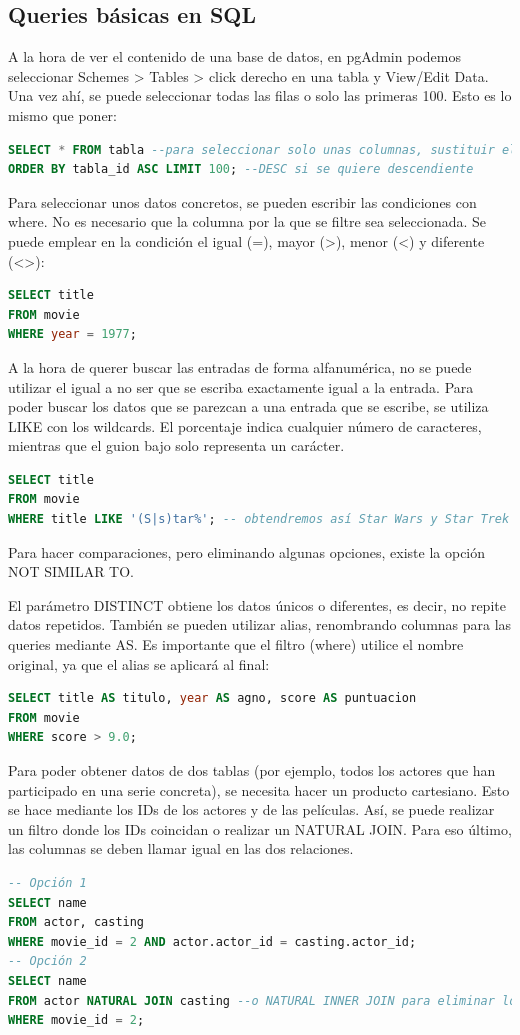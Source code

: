 \subsection{Queries básicas en SQL}
A la hora de ver el contenido de una base de datos, en pgAdmin podemos seleccionar Schemes > Tables > click derecho en una tabla y View/Edit Data. Una vez ahí, se puede seleccionar todas las filas o solo las primeras 100. Esto es lo mismo que poner:
\begin{lstlisting}[language=SQL]
SELECT * FROM tabla --para seleccionar solo unas columnas, sustituir el asterisco por el nombre de las columnas
ORDER BY tabla_id ASC LIMIT 100; --DESC si se quiere descendiente
\end{lstlisting}
Para seleccionar unos datos concretos, se pueden escribir las condiciones con where. No es necesario que la columna por la que se filtre sea seleccionada. Se puede emplear en la condición el igual (=), mayor (>), menor (<) y diferente (<>):
\begin{lstlisting}[language=SQL]
SELECT title 
FROM movie 
WHERE year = 1977;
\end{lstlisting}
A la hora de querer buscar las entradas de forma alfanumérica, no se puede utilizar el igual a no ser que se escriba exactamente igual a la entrada. Para poder buscar los datos que se parezcan a una entrada que se escribe, se utiliza LIKE con los wildcards. El porcentaje indica cualquier número de caracteres, mientras que el guion bajo solo representa un carácter.
\begin{lstlisting}[language=SQL]
SELECT title 
FROM movie 
WHERE title LIKE '(S|s)tar%'; -- obtendremos así Star Wars y Star Trek junto con películas que empiecen por star (en minúscula).
\end{lstlisting}
Para hacer comparaciones, pero eliminando algunas opciones, existe la opción NOT SIMILAR TO. 

El parámetro DISTINCT obtiene los datos únicos o diferentes, es decir, no repite datos repetidos. También se pueden utilizar alias, renombrando columnas para las queries mediante AS. Es importante que el filtro (where) utilice el nombre original, ya que el alias se aplicará al final: 
\begin{lstlisting}[language=SQL]
SELECT title AS titulo, year AS agno, score AS puntuacion
FROM movie
WHERE score > 9.0;
\end{lstlisting}

Para poder obtener datos de dos tablas (por ejemplo, todos los actores que han participado en una serie concreta), se necesita hacer un producto cartesiano. Esto se hace mediante los IDs de los actores y de las películas. Así, se puede realizar un filtro donde los IDs coincidan o realizar un NATURAL JOIN. Para eso último, las columnas se deben llamar igual en las dos relaciones.
\begin{lstlisting}[language=SQL]
-- Opción 1
SELECT name
FROM actor, casting
WHERE movie_id = 2 AND actor.actor_id = casting.actor_id;
-- Opción 2
SELECT name
FROM actor NATURAL JOIN casting --o NATURAL INNER JOIN para eliminar los datos nulos
WHERE movie_id = 2;
\end{lstlisting}

